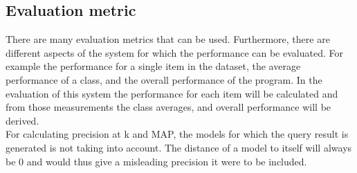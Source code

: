 \documentclass{bigdata}
\begin{document}
\subsection{Evaluation metric}
There are many evaluation metrics that can be used. Furthermore, there are different aspects of the system for which the performance can be evaluated. For example the performance for a single item in the dataset, the average performance of a class, and the overall performance of the program. In the evaluation of this system the performance for each item will be calculated and from those measurements the class averages, and overall performance will be derived. \\
For calculating precision at k and MAP, the models for which the query result is generated is not taking into account. The distance of a model to itself will always be 0 and would thus give a misleading precision it were to be included.
\end{document}
